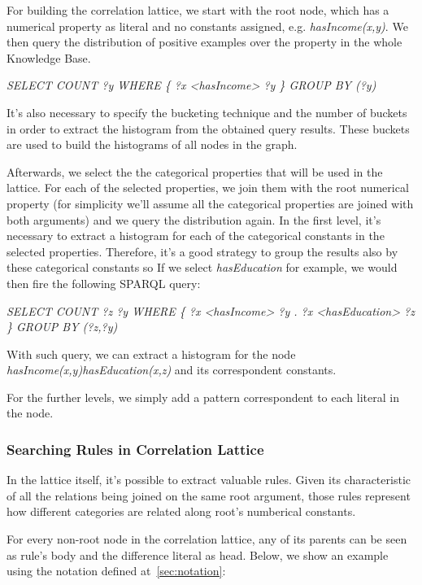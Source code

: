 For building the correlation lattice, we start with the root node, which has a numerical property as literal and no
constants assigned, e.g. \emph{hasIncome(x,y)}. We then query the  distribution of positive examples over the property
in the whole Knowledge Base.

\begin{center}
 \emph{SELECT COUNT ?y WHERE \{ ?x <hasIncome> ?y \} GROUP BY (?y)}
\end{center}

It's also necessary to specify the bucketing technique and the number of buckets in order to extract the histogram from the obtained query results. These buckets are used to build the histograms of all nodes in the graph.

Afterwards, we select the the categorical properties that will be used in the lattice. For each of the selected properties, we join them with the root numerical property (for simplicity we'll assume all the categorical properties are joined with both  arguments) and we query the distribution again. In the first level, it's necessary to extract a histogram for each of the categorical constants in the selected properties. Therefore, it's a good strategy to group the results also by these categorical constants so If we select \emph{hasEducation} for example, we would then fire the following SPARQL query:

\begin{center}
 \emph{SELECT COUNT ?z ?y WHERE \{ ?x <hasIncome> ?y . ?x <hasEducation> ?z \} GROUP BY (?z,?y)}
\end{center}

With such query, we can extract a histogram for the node \emph{hasIncome(x,y)hasEducation(x,z)} and its correspondent
constants. 

For the further levels, we simply add a pattern correspondent to each literal in the node. 


\subsubsection{Searching Rules in Correlation Lattice}
\label{sec:searchRulesInCL}

In the lattice itself, it's possible to extract valuable rules. Given its characteristic of all the relations being
joined on the same root argument, those rules represent how different categories are related along root's numberical
constants.

For every non-root node in the correlation lattice, any of its parents can be seen as rule's body and the difference
literal as head. Below, we show an example using the notation defined at~\ref{sec:notation}:

